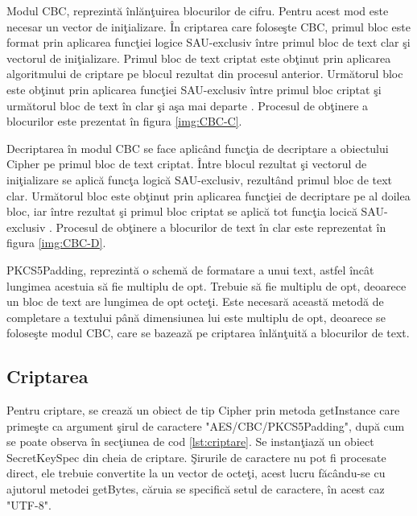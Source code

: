 Modul CBC, reprezint\u{a} \^{i}nl\u{a}n\c{t}uirea blocurilor de cifru. Pentru acest mod este necesar un vector de ini\c{t}ializare. \^{I}n criptarea care folose\c{s}te CBC, primul bloc este format prin aplicarea func\c{t}iei logice SAU-exclusiv \^{i}ntre primul bloc de text clar \c{s}i vectorul de ini\c{t}ializare. Primul bloc de text criptat este ob\c{t}inut prin aplicarea algoritmului de criptare pe blocul rezultat din procesul anterior. Urm\u{a}torul bloc este ob\c{t}inut prin aplicarea func\c{t}iei SAU-exclusiv \^{i}ntre primul bloc criptat \c{s}i urm\u{a}torul bloc de text \^{i}n clar \c{s}i a\c{s}a mai departe \cite{Dworkin:2001:SER:2206247}. Procesul de ob\c{t}inere a blocurilor este prezentat \^{i}n figura \ref{img:CBC-C}.

\newpage
Decriptarea \^{i}n modul CBC se face aplic\^{a}nd func\c{t}ia de decriptare a obiectului Cipher pe primul bloc de text criptat. \^{I}ntre blocul rezultat \c{s}i vectorul de ini\c{t}ializare se aplic\u{a} func\c{t}a logic\u{a} SAU-exclusiv, rezult\^{a}nd primul bloc de text clar. Urm\u{a}torul bloc este ob\c{t}inut prin aplicarea func\c{t}iei de decriptare pe al doilea bloc, iar \^{i}ntre rezultat \c{s}i primul bloc criptat se aplic\u{a} tot func\c{t}ia locic\u{a} SAU-exclusiv \cite{Dworkin:2001:SER:2206247}. Procesul de ob\c{t}inere a blocurilor de text \^{i}n clar este reprezentat \^{i}n figura \ref{img:CBC-D}.
  

PKCS5Padding, reprezint\u{a} o schem\u{a} de formatare a unui text, astfel \^{i}nc\^{a}t lungimea acestuia s\u{a} fie multiplu de opt. Trebuie s\u{a} fie multiplu de opt, deoarece un bloc de text are lungimea de opt octe\c{t}i. Este necesar\u{a} aceast\u{a} metod\u{a} de completare a textului p\^{a}n\u{a} dimensiunea lui este multiplu de opt, deoarece se folose\c{s}te modul CBC, care se bazeaz\u{a} pe criptarea \^{i}nl\u{a}n\c{t}uit\u{a} a blocurilor de text.

\subsection{Criptarea}

Pentru criptare, se creaz\u{a} un obiect de tip Cipher prin metoda getInstance care prime\c{s}te ca argument \c{s}irul de caractere "AES/CBC/PKCS5Padding", dup\u{a} cum se poate observa \^{i}n sec\c{t}iunea de cod \ref{lst:criptare}. Se instan\c{t}iaz\u{a} un obiect SecretKeySpec din cheia de criptare. \c{S}irurile de caractere nu pot fi procesate direct, ele trebuie convertite la un vector de octe\c{t}i, acest lucru f\u{a}c\^{a}ndu-se cu ajutorul metodei getBytes, c\u{a}ruia se specific\u{a} setul de caractere, \^{i}n acest caz "UTF-8".

